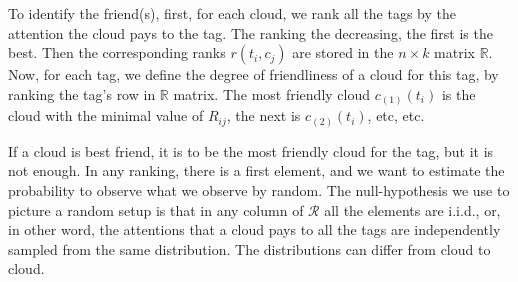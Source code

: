 \documentclass{llncs}
\begin{document}

To identify the friend(s), first, for each cloud, we rank all the tags by the attention the cloud pays to the tag. The ranking the decreasing, the first is the best. Then the corresponding ranks $r(t_i,c_j)$ are stored in the $n\times k$ matrix $\mathbb{R}$. Now, for each tag, we define the degree of friendliness of a cloud for this tag, by ranking the tag's row in $\mathbb{R}$ matrix. The most friendly cloud $c_{(1)}(t_i)$ is the cloud with the minimal value of $R_{ij}$, the next is $c_{(2)}(t_i)$, etc, etc. 

If a cloud is best friend, it is to be the most friendly cloud for the tag, but it is not enough. In any ranking, there is a first element, and we want to estimate the probability to observe what we observe by random. The null-hypothesis we use to picture a random setup is that in any column of $\mathcal{R}$ all the elements are i.i.d., or, in other word, the attentions that a cloud pays to all the tags are independently sampled from the same distribution. The distributions can differ from cloud to cloud. 
\end{document}
